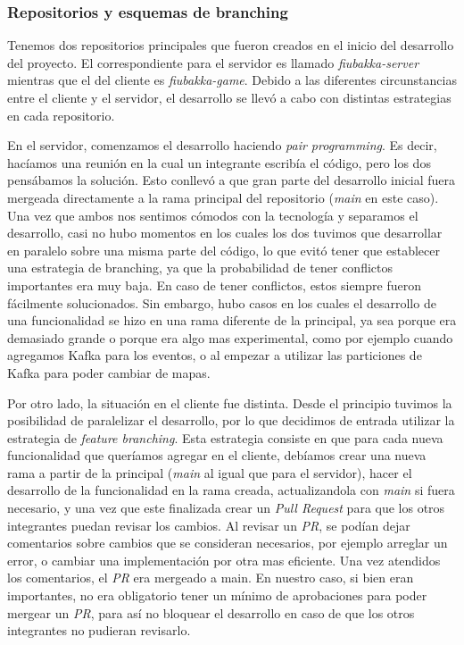 \subsubsection{Repositorios y esquemas de branching}
\noindent Tenemos dos repositorios principales que fueron creados en el inicio del desarrollo del proyecto.
El correspondiente para el servidor es llamado \textit{fiubakka-server} mientras que el del cliente es \textit{fiubakka-game}.
Debido a las diferentes circunstancias entre el cliente y el servidor, el desarrollo se llevó a cabo con distintas estrategias
en cada repositorio.

En el servidor, comenzamos el desarrollo haciendo \textit{pair programming}. Es decir, hacíamos una reunión en la cual un integrante
escribía el código, pero los dos pensábamos la solución. Esto conllevó a que gran parte del desarrollo inicial fuera mergeada directamente
a la rama principal del repositorio (\textit{main} en este caso). Una vez que ambos nos sentimos cómodos con la tecnología y separamos el 
desarrollo, casi no hubo momentos en los cuales los dos tuvimos que desarrollar en paralelo sobre una misma parte del código, lo que evitó tener
que establecer una estrategia de branching, ya que la probabilidad de tener conflictos importantes era muy baja. En caso de tener conflictos, 
estos siempre fueron fácilmente solucionados.
Sin embargo, hubo casos en los cuales el desarrollo de una funcionalidad se hizo en una rama diferente de la principal, ya sea porque era demasiado
grande o porque era algo mas experimental, como por ejemplo cuando agregamos Kafka para los eventos, o al empezar a utilizar las particiones de Kafka
para poder cambiar de mapas.

Por otro lado, la situación en el cliente fue distinta. Desde el principio tuvimos la posibilidad de paralelizar el desarrollo, por lo que 
decidimos de entrada utilizar la estrategia de \textit{feature branching}. Esta estrategia consiste en que para cada nueva funcionalidad
que queríamos agregar en el cliente, debíamos crear una nueva rama a partir de la principal (\textit{main} al igual que para el servidor),
hacer el desarrollo de la funcionalidad en la rama creada, actualizandola con \textit{main} si fuera necesario, y una vez que este finalizada
crear un \textit{Pull Request} para que los otros integrantes puedan revisar los cambios. Al revisar un \textit{PR}, se podían dejar comentarios
sobre cambios que se consideran necesarios, por ejemplo arreglar un error, o cambiar una implementación por otra mas eficiente. Una vez atendidos
los comentarios, el \textit{PR} era mergeado a main. En nuestro caso, si bien eran importantes, no era obligatorio tener un mínimo de aprobaciones para poder mergear un \textit{PR},
para así no bloquear el desarrollo en caso de que los otros integrantes no pudieran revisarlo.


